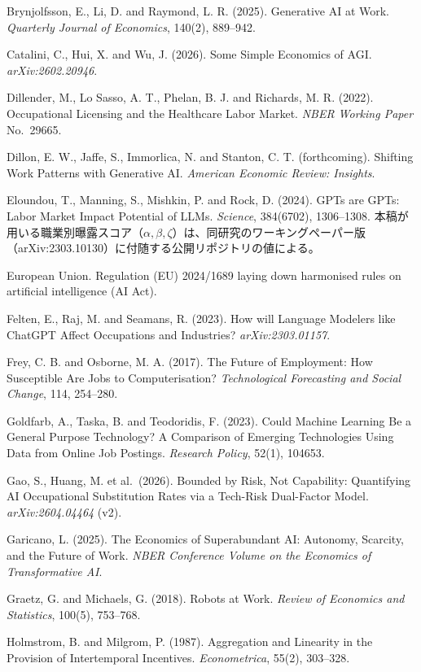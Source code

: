 \documentclass[11pt]{article}
\theoremstyle{plain}
\theoremstyle{definition}
\theoremstyle{remark}
\begin{document}
\begin{list}{}{\setlength{\leftmargin}{1.4em}\setlength{\itemindent}{-1.4em}\setlength{\itemsep}{2pt}}
\item Brynjolfsson, E., Li, D. and Raymond, L. R. (2025). Generative AI at Work. \textit{Quarterly Journal of Economics}, 140(2), 889--942.
\item Catalini, C., Hui, X. and Wu, J. (2026). Some Simple Economics of AGI. \textit{arXiv:2602.20946}.
\item Dillender, M., Lo Sasso, A. T., Phelan, B. J. and Richards, M. R. (2022). Occupational Licensing and the Healthcare Labor Market. \textit{NBER Working Paper} No.\ 29665.
\item Dillon, E. W., Jaffe, S., Immorlica, N. and Stanton, C. T. (forthcoming). Shifting Work Patterns with Generative AI. \textit{American Economic Review: Insights}.
\item Eloundou, T., Manning, S., Mishkin, P. and Rock, D. (2024). GPTs are GPTs: Labor Market Impact Potential of LLMs. \textit{Science}, 384(6702), 1306--1308. 本稿が用いる職業別曝露スコア（$\alpha,\beta,\zeta$）は、同研究のワーキングペーパー版（arXiv:2303.10130）に付随する公開リポジトリの値による。
\item European Union. Regulation (EU) 2024/1689 laying down harmonised rules on artificial intelligence (AI Act).
\item Felten, E., Raj, M. and Seamans, R. (2023). How will Language Modelers like ChatGPT Affect Occupations and Industries? \textit{arXiv:2303.01157}.
\item Frey, C. B. and Osborne, M. A. (2017). The Future of Employment: How Susceptible Are Jobs to Computerisation? \textit{Technological Forecasting and Social Change}, 114, 254--280.
\item Goldfarb, A., Taska, B. and Teodoridis, F. (2023). Could Machine Learning Be a General Purpose Technology? A Comparison of Emerging Technologies Using Data from Online Job Postings. \textit{Research Policy}, 52(1), 104653.
\item Gao, S., Huang, M. et al.\ (2026). Bounded by Risk, Not Capability: Quantifying AI Occupational Substitution Rates via a Tech-Risk Dual-Factor Model. \textit{arXiv:2604.04464} (v2).
\item Garicano, L. (2025). The Economics of Superabundant AI: Autonomy, Scarcity, and the Future of Work. \textit{NBER Conference Volume on the Economics of Transformative AI}.
\item Graetz, G. and Michaels, G. (2018). Robots at Work. \textit{Review of Economics and Statistics}, 100(5), 753--768.
\item Holmstrom, B. and Milgrom, P. (1987). Aggregation and Linearity in the Provision of Intertemporal Incentives. \textit{Econometrica}, 55(2), 303--328.

\end{list}
\end{document}
